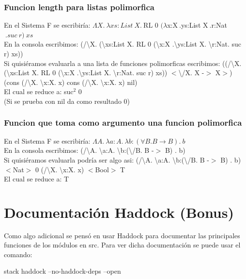 \documentclass[12pt, titlepage, a4paper]{article}
\begin{document}
\subsubsection{Funcion length para listas polimorfica}
\noindent En el Sistema F se escribiría: $\Lambda X.\ \lambda xs:List \ X. \ $RL 0 $(\lambda $x:X$ \ .$ys:List X$ \ .$r:Nat$\ .suc\ r)\ xs$ \\
En la consola escribimos: (/\textbackslash X. (\textbackslash xs:List X. RL 0 (\textbackslash x:X .\textbackslash ys:List X. \textbackslash r:Nat. suc r) xs)) \\
Si quisiéramos evaluarla a una lista de funciones polimorficas escribimos: 
((/\textbackslash X. (\textbackslash xs:List X. RL 0 (\textbackslash x:X .\textbackslash ys:List X. \textbackslash r:Nat. suc r) xs)) $<$\textbackslash/X. X -$>$ X$>$) 
(cons (/\textbackslash X. \textbackslash x:X. x) cons (/\textbackslash X. \textbackslash x:X. x) nil)\\
El cual se reduce a: suc$^2$ 0 \\

\noindent (Si se prueba con nil da como resultado 0)

\subsubsection{Funcion que toma como argumento una funcion polimorfica}
\noindent En el Sistema F se escribiría: $\Lambda A.\ \lambda a:A.\ \lambda b:(\forall B. B \rightarrow  B). \ b$ \\
En la consola escribimos: (/\textbackslash A. \textbackslash a:A. \textbackslash b:(\textbackslash /B. B -$>$ B) . b)\\
Si quisiéramos evaluarla podría ser algo asi: (/\textbackslash A. \textbackslash a:A. \textbackslash b:(\textbackslash /B. B -$>$ B) . b) $<$Nat$>$ 0 (/\textbackslash X. \textbackslash x:X. x) $<$Bool$>$ T\\
El cual se reduce a: T

\section{Documentación Haddock (Bonus)}
Como algo adicional se pensó en usar Haddock \cite{HaddockDoc} para documentar las principales funciones de los módulos en src.
Para ver dicha documentación se puede usar el comando:
\begin{center}
  stack haddock --no-haddock-deps --open
\end{center}

\newpage



\end{document}
